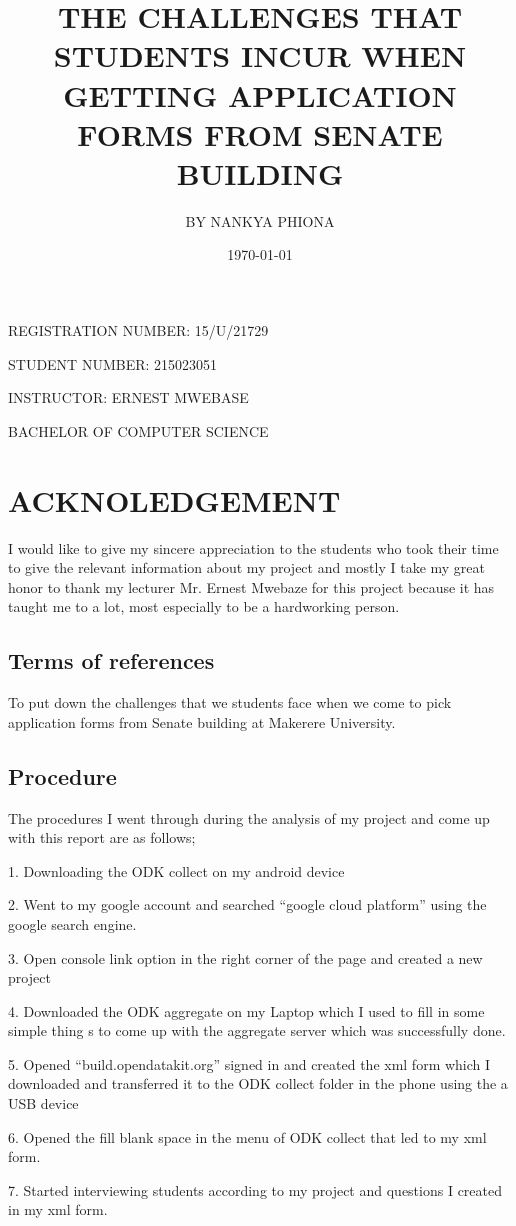 \documentclass[14pt]{article}
\begin{document}
 \begin{huge}REGISTRATION NUMBER: 15/U/21729\end{huge}
 \begin{huge}STUDENT NUMBER: 215023051\end{huge}
  \begin{huge}INSTRUCTOR: ERNEST MWEBASE\end{huge}
 \begin{huge}BACHELOR OF COMPUTER SCIENCE\end{huge}
\title{THE CHALLENGES THAT STUDENTS INCUR WHEN GETTING APPLICATION FORMS FROM SENATE BUILDING}

 

\author{BY NANKYA PHIONA }
\maketitle 

\date{\today}
 
\tableofcontents

\section{ACKNOLEDGEMENT}
I would like to give my sincere appreciation to the students who took their time to give the relevant information about my project and mostly I take my great honor to thank my lecturer Mr. Ernest Mwebaze for this project because it has taught me to a lot, most especially to be a hardworking person.

 \subsection{Terms of references}
To put down the challenges that we students face when we come to pick application forms from Senate building at Makerere University.

 \subsection{Procedure}
The procedures I went through during the analysis of my project and come up with this report are as follows;\par
1.	Downloading the ODK collect on my android device\par
2.	Went to my google account and searched “google cloud platform” using the google search engine.  \par
3.       Open console link option in the right corner of the page and created a new project\par
4.	Downloaded the ODK aggregate on my Laptop which I used to fill in some simple thing s to come up with the aggregate server which was successfully done.\par
5.	Opened “build.opendatakit.org” signed in and created the xml form which I downloaded and transferred it to the ODK collect folder in the phone using the a USB device\par
6.	Opened the fill blank space in the menu of ODK collect that led to my xml form.\par
7.	Started interviewing students according to my project and questions I created in my xml form.
\end{document}

